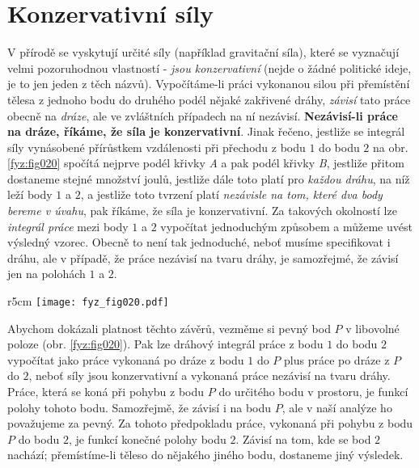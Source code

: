   \section{Konzervativní síly}
    V přírodě se vyskytují určité síly (například gravitační síla), které se vyznačují velmi 
    pozoruhodnou vlastností - \emph{jsou konzervativní} (nejde o žádné politické ideje, je to jen 
    jeden z těch  názvů).  Vypočítáme-li práci vykonanou silou při přemístění tělesa z 
    jednoho bodu do druhého podél nějaké zakřivené dráhy, \emph{závisí} tato práce obecně na 
    \emph{dráze}, ale ve zvláštních případech na ní nezávisí. \textbf{Nezávisí-li práce na dráze, 
    říkáme, že síla je konzervativní}. Jinak řečeno, jestliže se integrál síly vynásobené 
    přírůstkem vzdálenosti při přechodu z bodu \(1\) do bodu \(2\) na obr. \ref{fyz:fig020} spočítá 
    nejprve podél křivky \emph{A} a pak podél křivky \emph{B}, jestliže přitom dostaneme stejné 
    množství joulů, jestliže dále toto platí pro \emph{každou dráhu}, na níž leží body \(1\) a 
    \(2\), a jestliže toto tvrzení platí \emph{nezávisle na tom, které dva body bereme v úvahu}, 
    pak říkáme, že síla je konzervativní. Za takových okolností lze \emph{integrál práce} mezi body 
    \(1\) a \(2\) vypočítat jednoduchým způsobem a můžeme uvést výsledný vzorec. Obecně to není tak 
    jednoduché, neboť musíme specifikovat i dráhu, ale v případě, že práce nezávisí na tvaru dráhy, 
    je samozřejmé, že závisí jen na polohách \(1\) a \(2\).
    
    \begin{wrapfigure}[11]{r}{5cm}  %
      \centering
      \texttt{[image: fyz\_fig020.pdf]}
      \caption{Možné dráhy mezi dvěma body v silovém poli (\cite[s.~202]{Feynman01})}
      \label{fyz:fig020}
    \end{wrapfigure}
    Abychom dokázali platnost těchto závěrů, vezměme si pevný bod \(P\) v libovolné poloze (obr. 
    \ref{fyz:fig020}). Pak lze dráhový integrál práce z bodu \(1\) do bodu \(2\) vypočítat jako 
    práce vykonaná po dráze z bodu \(1\) do \(P\) plus práce po dráze z \(P\) do \(2\), neboť síly 
    jsou konzervativní a vykonaná práce nezávisí na tvaru dráhy. Práce, která se koná při pohybu z 
    bodu \(P\) do určitého bodu v prostoru, je funkcí polohy tohoto bodu. Samozřejmě, že závisí i 
    na bodu \(P\), ale v naší analýze ho považujeme za pevný. Za tohoto předpokladu práce, vykonaná 
    při pohybu z bodu \(P\) do bodu \(2\), je funkcí konečné polohy bodu \(2\). Závisí na tom, kde 
    se bod \(2\) nachází; přemístíme-li těleso do nějakého jiného bodu, dostaneme jiný výsledek.

